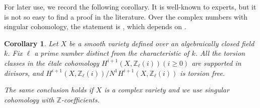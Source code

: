 \documentclass{amsart}
\newtheorem{cor}[theorem]{Corollary}
\theoremstyle{definition}
\theoremstyle{remark}
\newcommand{\mbb}{\mathbb}
\newcommand{\ZZ}{\mbb{Z}}
\begin{document}
For later use, we record the following corollary. It is well-known to experts, but it is not so easy to find a proof in the literature. Over the complex numbers with singular cohomology, the statement is \cite[Proposition 2.8]{BO_Coniveau}, which depends on \cite[Th\'eor\`eme 3.1]{CTVoisin}. 
\begin{cor}\label{cor:torsionfree}
    Let $X$ be a smooth variety defined over an algebraically closed field $k$. Fix $\ell$ a prime number distinct from the characteristic of $k$.  All the torsion classes in the \'etale cohomology $H^{i+1}(X, \ZZ_\ell(i)) (i \geq 0)$ are supported in divisors, and $H^{i+1}(X, \ZZ_\ell(i))/N^1H^{i+1}(X, \ZZ_\ell(i))$ is torsion free.

    The same conclusion holds if $X$ is a complex variety and we use singular cohomology with $\ZZ$-coefficients.
\end{cor}
\end{document}

